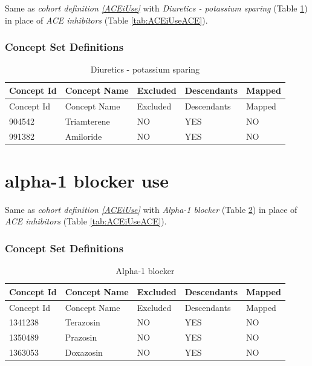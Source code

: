 \documentclass[11pt]{book}
\theoremstyle{definition}
\theoremstyle{definition}
\theoremstyle{definition}
\theoremstyle{remark}
\begin{document}
Same as \emph{cohort definition \ref{ACEiUse}} with \emph{Diuretics - potassium sparing} (Table \ref{tab:DPUseDPs}) in place of \emph{ACE inhibitors} (Table \ref{tab:ACEiUseACE}).

\hypertarget{concept-set-definitions-13}{%
\subsubsection*{Concept Set Definitions}\label{concept-set-definitions-13}}

\begin{longtable}[]{@{}lllll@{}}
\caption{\label{tab:DPUseDPs} Diuretics - potassium sparing}\tabularnewline
\toprule
Concept Id & Concept Name & Excluded & Descendants & Mapped\tabularnewline
\midrule
\endfirsthead
\toprule
Concept Id & Concept Name & Excluded & Descendants & Mapped\tabularnewline
\midrule
\endhead
904542 & Triamterene & NO & YES & NO\tabularnewline
991382 & Amiloride & NO & YES & NO\tabularnewline
\bottomrule
\end{longtable}

\hypertarget{A1BUse}{%
\section{alpha-1 blocker use}\label{A1BUse}}

Same as \emph{cohort definition \ref{ACEiUse}} with \emph{Alpha-1 blocker} (Table \ref{tab:A1BUseA1Bs}) in place of \emph{ACE inhibitors} (Table \ref{tab:ACEiUseACE}).

\hypertarget{concept-set-definitions-14}{%
\subsubsection*{Concept Set Definitions}\label{concept-set-definitions-14}}

\begin{longtable}[]{@{}lllll@{}}
\caption{\label{tab:A1BUseA1Bs} Alpha-1 blocker}\tabularnewline
\toprule
Concept Id & Concept Name & Excluded & Descendants & Mapped\tabularnewline
\midrule
\endfirsthead
\toprule
Concept Id & Concept Name & Excluded & Descendants & Mapped\tabularnewline
\midrule
\endhead
1341238 & Terazosin & NO & YES & NO\tabularnewline
1350489 & Prazosin & NO & YES & NO\tabularnewline
1363053 & Doxazosin & NO & YES & NO\tabularnewline
\bottomrule
\end{longtable}
\end{document}
